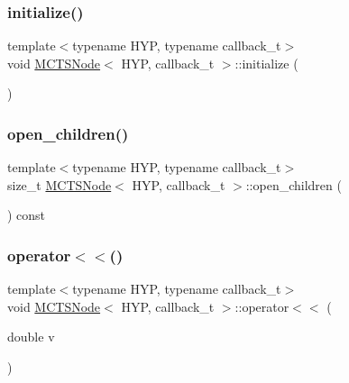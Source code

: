 \mbox{\label{class_m_c_t_s_node_ad0644bc487fe620c67a3c8fb4a609ac2}} 
\subsubsection{\texorpdfstring{initialize()}{initialize()}}
{\footnotesize\ttfamily template$<$typename H\+YP, typename callback\+\_\+t$>$ \\
void \hyperlink{class_m_c_t_s_node}{M\+C\+T\+S\+Node}$<$ H\+YP, callback\+\_\+t $>$\+::initialize (\begin{DoxyParamCaption}{ }\end{DoxyParamCaption})\hspace{0.3cm}{\ttfamily [inline]}}

\mbox{\label{class_m_c_t_s_node_a678226e918e97f7b83821c9196cb84d4}} 
\subsubsection{\texorpdfstring{open\+\_\+children()}{open\_children()}}
{\footnotesize\ttfamily template$<$typename H\+YP, typename callback\+\_\+t$>$ \\
size\+\_\+t \hyperlink{class_m_c_t_s_node}{M\+C\+T\+S\+Node}$<$ H\+YP, callback\+\_\+t $>$\+::open\+\_\+children (\begin{DoxyParamCaption}{ }\end{DoxyParamCaption}) const\hspace{0.3cm}{\ttfamily [inline]}}

\mbox{\label{class_m_c_t_s_node_a8bcef9cd7a6e04b9835b632bc98faa6d}} 
\subsubsection{\texorpdfstring{operator$<$$<$()}{operator<<()}}
{\footnotesize\ttfamily template$<$typename H\+YP, typename callback\+\_\+t$>$ \\
void \hyperlink{class_m_c_t_s_node}{M\+C\+T\+S\+Node}$<$ H\+YP, callback\+\_\+t $>$\+::operator$<$$<$ (\begin{DoxyParamCaption}\item[{double}]{v }\end{DoxyParamCaption})\hspace{0.3cm}{\ttfamily [inline]}}

